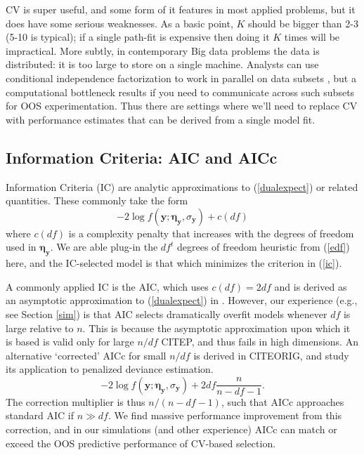 \documentclass[12pt]{article}
\newcommand{\bs}[1]{\boldsymbol{#1}}
\newcommand{\bm}[1]{\mathbf{#1}}
\begin{document}
CV is super useful, and some form of it features in most applied problems, but
it does have some serious weaknesses. As a basic point, $K$ should be bigger
than 2-3 (5-10 is typical); if a single path-fit is expensive then doing it
$K$ times will be impractical.  More subtly, in contemporary Big data problems
the data is distributed: it is too large to store on a single machine.
Analysts can use conditional independence factorization to work in parallel on
data subsets \citep[e.g.,][]{taddy_distributed_2013}, but a computational
bottleneck results if you need to communicate across such subsets for OOS
experimentation.  Thus there are settings where we'll need to replace CV with
performance estimates that can be derived from  a single model fit.


\subsection{Information Criteria: AIC and AICc}


Information Criteria (IC) are analytic approximations to (\ref{dualexpect}) or related quantities.  These commonly take the form
\begin{equation}\label{ic}
 -2\log f(\bm{y}; \bs{\eta}_{\bm{y}},\sigma_{\bm{y}}) + c(df)
 \end{equation} 
where $c(df)$ is a complexity penalty that increases with the degrees of freedom used in $\bs{\eta}_{\bm{y}}$.
 We are able plug-in the $df^t$ degrees of
freedom heuristic from (\ref{edf}) here, and the IC-selected model is that
which minimizes the criterion in (\ref{ic}).

A commonly applied IC is the AIC, which uses $c(df)=2df$ and is derived as an asymptotic approximation to (\ref{dualexpect}) in 
\cite{akaike_information_1973}.  However, our experience (e.g., see Section \ref{sim}) is that AIC selects dramatically overfit models whenever $df$ is large relative to $n$.  This is because the asymptotic approximation upon which it is based is valid only for large $n/df$ CITEP, and thus fails in high dimensions.  An alternative `corrected' AICc for small $n/df$ is derived in CITEORIG, and \citet{flynn_efficiency_2013} study its application to penalized deviance estimation.
\begin{equation}
-2\log f(\bm{y}; \bs{\eta}_{\bm{y}},\sigma_{\bm{y}}) + 2df\frac{n}{n-df-1}.
\end{equation}
The correction multiplier is thus $n/(n-df-1)$, such that AICc approaches standard AIC if $n\gg df$.  We find massive performance improvement from this correction, and in our simulations (and other experience) AICc can match or exceed the OOS predictive performance of CV-based selection.  
\end{document}
